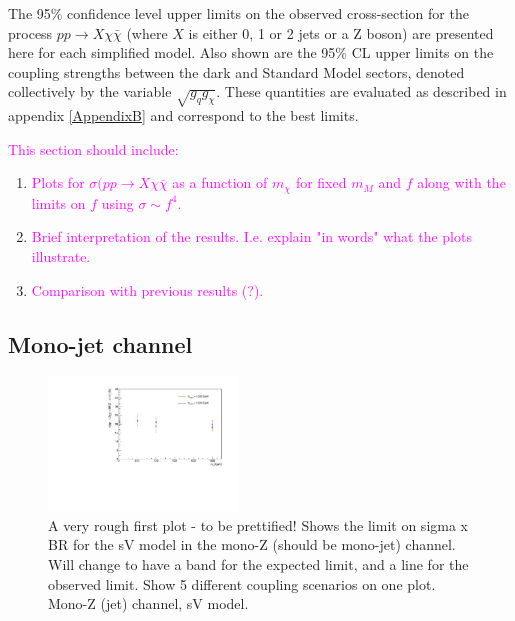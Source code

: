 \begin{flushleft}
The 95\% confidence level upper limits on the observed cross-section for the process $pp \rightarrow X\chi\bar{\chi}$ (where $X$ is either 0, 1 or 2 jets or a Z boson) are presented here for each simplified model. Also shown are the 95\% CL upper limits on the coupling strengths between the dark and Standard Model sectors, denoted collectively by the variable $\sqrt{g_{q}g_{\chi}}$. These quantities are evaluated as described in appendix \ref{AppendixB} and correspond to the best limits.
\bigskip

\textcolor{magenta}{This section should include:}
\begin{enumerate}
\item \textcolor{magenta}{Plots for $\sigma(pp \rightarrow X \chi \bar{\chi}$ as a function of $m_{\chi}$ for fixed $m_{M}$ and $f$ along with the limits on $f$ using $\sigma \sim f^{4}$.}
\item \textcolor{magenta}{Brief interpretation of the results. I.e. explain "in words" what the plots illustrate.}
\item \textcolor{magenta}{Comparison with previous results (?).}
\end{enumerate}
\end{flushleft}

\subsection{Mono-jet channel}

\begin{figure}[!h]
\begin{center}
\includegraphics[width=0.45\textwidth]{figures/monoZ_sigma_limits_variedDMmass.pdf}
\caption{A very rough first plot - to be prettified! Shows the limit on sigma x BR for the sV model in the mono-Z (should be mono-jet) channel. Will change to have a band for the expected limit, and a line for the observed limit. Show 5 different coupling scenarios on one plot. Mono-Z (jet) channel, sV model.}
\label{fig:MonoZ_SVD_limit}
\end{center}
\end{figure}

